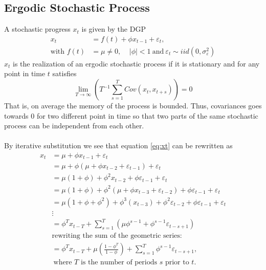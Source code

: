 \subsection{Ergodic Stochastic Process}
A stochastic progress $x_t$ is given by the DGP
\begin{equation}
  \begin{split}
    x_t &= f(t) + \phi x_{t-1}+\varepsilon_t,\\
    \text{with }f(t) &= \mu \neq 0,\ \ \ \ \ |\phi|<1\ \text{and}\ \varepsilon_t\sim iid(0,\sigma^2_\varepsilon)
    \label{eq:xt}
  \end{split}
\end{equation}
$x_t$ is the realization of an ergodic stochastic process if it is stationary and for any point in time $t$ satisfies
\begin{equation}
  \displaystyle{\lim_{T\to\infty}}\left(T^{-1}\sum_{s=1}^TCov(x_t,x_{t+s})\right)=0
\end{equation}
That is, on average the memory of the process is bounded. Thus, covariances goes towards $0$ for two different point in time so that two parts of the same stochastic process can be independent from each other.
\\ \\
By iterative substitution we see that equation \ref{eq:xt} can be rewritten as
\begin{equation}
  \begin{split}
    x_t &= \mu + \phi x_{t-1} +\varepsilon_t \\
        &= \mu + \phi (\mu + \phi x_{t-2}+\varepsilon_{t-1}) +\varepsilon_t\\
        &= \mu (1+\phi) + \phi^2 x_{t-2}+ \phi\varepsilon_{t-1} +\varepsilon_t\\
        &= \mu (1+\phi) + \phi^2 (\mu + \phi x_{t-3}+\varepsilon_{t-2})+ \phi\varepsilon_{t-1}+\varepsilon_t\\
        &= \mu (1+\phi+\phi^2) + \phi^3(x_{t-3})+ \phi^2\varepsilon_{t-2} + \phi\varepsilon_{t-1} +\varepsilon_t\\
        &\vdots \\
        &= \phi^T x_{t-T} + \sum_{s=1}^T\left( \mu\phi^{s-1} + \phi^{s-1}\varepsilon_{t-s+1} \right)\\
        &\text{rewriting the sum of the geometric series:}\\
        &= \phi^T x_{t-T} + \mu\left(\frac{1-\phi^T}{1-\phi}\right) + \sum_{s=1}^T \phi^{s-1}\varepsilon_{t-s+1},\\
        &\ \text{where $T$ is the number of periods $s$ prior to $t$.}
        \label{eq:iterative}
  \end{split}
\end{equation}
